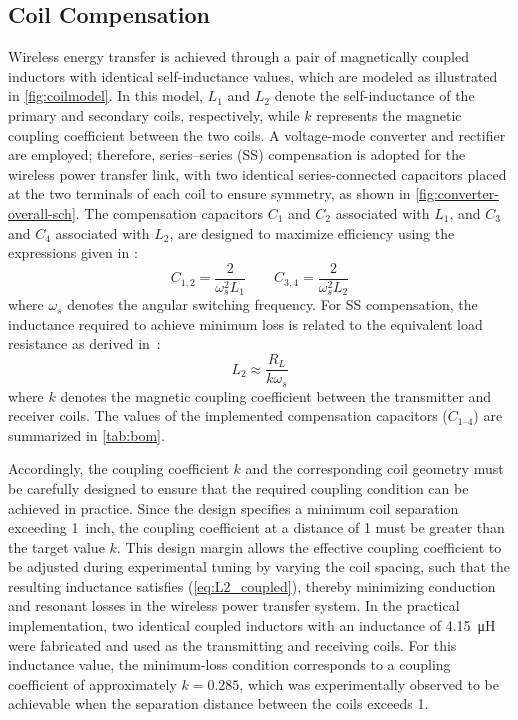 \documentclass[journal, 9pt, letterpaper, english]{IEEEtran}[2015/08/26]
\begin{document}
\subsection{Coil Compensation}
Wireless energy transfer is achieved through a pair of magnetically coupled inductors with identical self-inductance values, which are modeled as illustrated in \cref{fig:coilmodel}.
In this model, $L_1$ and $L_2$ denote the self-inductance of the primary and secondary coils, respectively, while $k$ represents the magnetic coupling coefficient between the two coils.
A voltage-mode converter and rectifier are employed; therefore, series--series (SS) compensation is adopted for the wireless power transfer link, with two identical series-connected capacitors placed at the two terminals of each coil to ensure symmetry, as shown in \cref{fig:converter-overall-sch}.
The compensation capacitors $C_1$ and $C_2$ associated with $L_1$, and $C_3$ and $C_4$ associated with $L_2$, are designed to maximize efficiency using the expressions given in \cite{10833657}:
\begin{equation}
	C_{1,2} = \frac{2}{\omega_s^2 L_1} \qquad
	C_{3,4}= \frac{2}{\omega_s^2 L_2}
\end{equation}
where $\omega_s$ denotes the angular switching frequency.
For SS compensation, the inductance required to achieve minimum loss is related to the equivalent load resistance as derived in~\cite{10833657}:
\begin{equation}
	L_2 \approx \frac{R_{L}}{k\omega_s}
	\label{eq:L2_coupled}
\end{equation}
where $k$ denotes the magnetic coupling coefficient between the transmitter and receiver coils.
The values of the implemented compensation capacitors ($C_{1\text{--}4}$) are summarized in \cref{tab:bom}.

Accordingly, the coupling coefficient $k$ and the corresponding coil geometry must be carefully designed to ensure that the required coupling condition can be achieved in practice.
Since the design specifies a minimum coil separation exceeding 1~inch, the coupling coefficient at a distance of \qty{1}{\inch} must be greater than the target value $k$.
This design margin allows the effective coupling coefficient to be adjusted during experimental tuning by varying the coil spacing, such that the resulting inductance satisfies (\ref{eq:L2_coupled}), thereby minimizing conduction and resonant losses in the wireless power transfer system.
In the practical implementation, two identical coupled inductors with an inductance of \qty{4.15}{\micro\henry} were fabricated and used as the transmitting and receiving coils.
For this inductance value, the minimum-loss condition corresponds to a coupling coefficient of approximately $k = 0.285$, which was experimentally observed to be achievable when the separation distance between the coils exceeds \qty{1}{\inch}.
\end{document}
